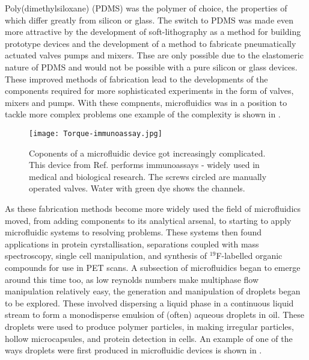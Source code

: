 Poly(dimethylsiloxane) (PDMS) was the polymer of choice, the properties of which differ greatly
from silicon or glass\citep{ng2002components,whitesides2001flexible}. The switch to PDMS was made even
more attractive by the development of soft-lithography as a method for building prototype
devices\citep{mcdonald2000fabrication} and the development of a method to fabricate pneumatically actuated valves
pumps and mixers\citep{mcdonald2000fabrication}. Thse are only possible due to the elastomeric nature of PDMS
and would not be possible with a pure silicon or glass devices.
These improved methods of fabrication lead to the developments of the components required for more sophisticated
experiments in the form of valves\citep{weibel2005torque}, mixers\citep{gunther2005micromixing} and pumps\citep{laser2004review}.
With these compnents, microfluidics was in a position to tackle more complex problems one example of the complexity is shown in .


\begin{figure}
  \begin{center}
  \texttt{[image: Torque-immunoassay.jpg]}
  \end{center}
  \caption{Coponents of a microfluidic device got increasingly complicated. This device from Ref.\citep{weibel2005torque} performs
  immunoassays - widely used in medical and biological research. The screws circled are manually operated valves. Water with green dye
  shows the channels.}
  \label{fig:immunoassay}
\end{figure}


As these fabrication methods become more widely used the field of microfluidics moved, from
adding components to its analytical
arsenal, to starting to apply microfluidic systems to resolving problems.
These systems then found applications in protein cyrstallisation\citep{hansen2002robust},
separations coupled with mass spectroscopy\citep{ramsey1997generating}, single cell manipulation\citep{wheeler2003microfluidic},
and synthesis of $^19$F-labelled organic compounds for use in PET
scans\citep{lee2005multistep}.
A subsection of microfluidics began to emerge around this time too, as
low reynolds numbers make multiphase flow manipulation
relatively easy, the generation and manipulation of droplets\citep{thorsen2001dynamic, link2004geometrically, tan2004design} began to be explored.
These involved dispersing a liquid phase in a continuous
liquid stream to form a monodisperse emulsion of (often) aqueous droplets in oil. These droplets
were used to produce polymer particles\citep{nie2005polymer}, in making irregular particles\citep{nisisako2007formation},
hollow microcapsules\citep{utada2005monodisperse}, and protein detection in cells\citep{huebner2007quantitative}. An example of one of the ways droplets were first
produced in microfluidic devices is shown in .

